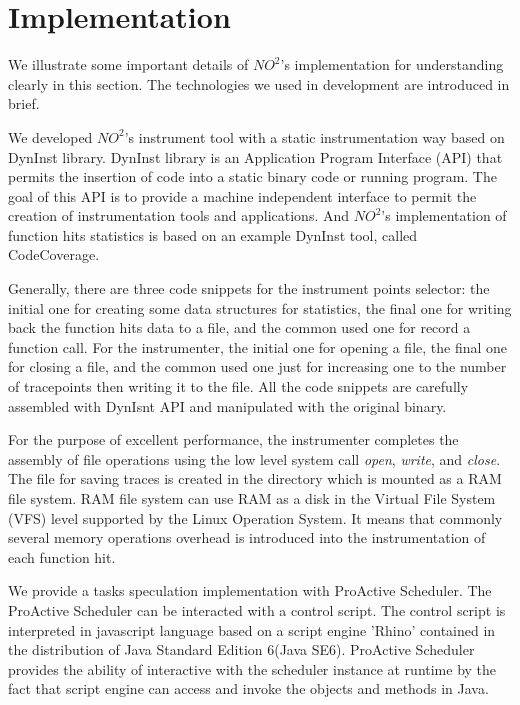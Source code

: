 \section{Implementation}

We illustrate some important details of $NO^2$'s implementation for understanding clearly in this section. The technologies we used in development are introduced in brief.

We developed $NO^2$'s instrument tool with a static instrumentation way based on DynInst library. DynInst library is an Application Program Interface (API) that permits the insertion of code into a static binary code or running program. The goal of this API is to provide a machine independent interface to permit the creation of instrumentation tools and applications. And $NO^2$'s implementation of function hits statistics is based on an example DynInst tool, called CodeCoverage.

Generally, there are three code snippets for the instrument points selector: the initial one for creating some data structures for statistics, the final one for writing back the function hits data to a file, and the common used one for record a function call. For the instrumenter, the initial one for opening a file, the final one for closing a file, and the common used one just for increasing one to the number of tracepoints then writing it to the file. All the code snippets are carefully assembled with DynIsnt API and manipulated with the original binary.

For the purpose of excellent performance, the instrumenter completes the assembly of file operations using the low level system call \emph{open}, \emph{write}, and \emph{close}. The file for saving traces is created in the directory which is mounted as a RAM file system. RAM file system can use RAM as a disk in the Virtual File System (VFS) level supported by the Linux Operation System. It means that commonly several memory operations overhead is introduced into the instrumentation of each function hit.

We provide a tasks speculation implementation with ProActive Scheduler. The ProActive Scheduler can be interacted with a control script. The control script is interpreted in javascript language based on a script engine 'Rhino' contained in the distribution of Java Standard Edition 6(Java SE6). ProActive Scheduler provides the ability of interactive with the scheduler instance at runtime by the fact that script engine can access and invoke the objects and methods in Java.

